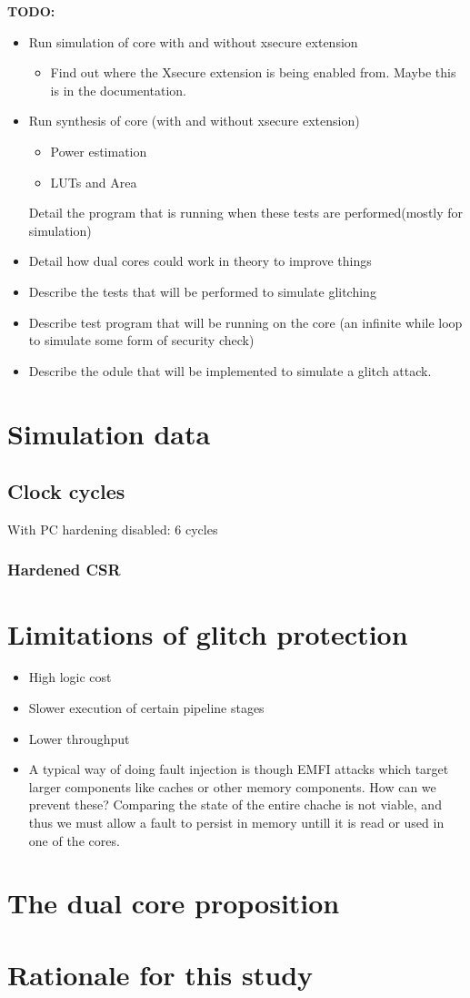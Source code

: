 \textbf{TODO:}
\begin{itemize}
    \item Run simulation of core with and without xsecure extension 
    \begin{itemize}
        \item Find out where the Xsecure extension is being enabled from. Maybe this is in the documentation. 
    \end{itemize}
    \item Run synthesis of core (with and without xsecure extension) 
    \begin{itemize}
        \item Power estimation 
        \item LUTs and Area 
    \end{itemize}
    Detail the program that is running when these tests are performed(mostly for simulation)
    \item Detail how dual cores could work in theory to improve things 
    \item Describe the tests that will be performed to simulate glitching
    \item Describe test program that will be running on the core (an infinite while loop to simulate some form of security check)
    \item Describe the odule that will be implemented to simulate a glitch attack.
\end{itemize}

\section{Simulation data}
\subsection{Clock cycles}
With PC hardening disabled: 6 cycles

\subsubsection{Hardened CSR}
\section{Limitations of glitch protection}
\label{sec:limits}

\begin{itemize}
    \item High logic cost 
    \item Slower execution of certain pipeline stages
    \item Lower throughput 
    \item A typical way of doing fault injection is though EMFI attacks which target larger components like caches or other memory components.
    How can we prevent these? Comparing the state of the entire chache is not viable, and thus we must allow a fault to persist in 
    memory untill it is read or used in one of the cores.
\end{itemize}
\section{The dual core proposition}
\section{Rationale for this study}


